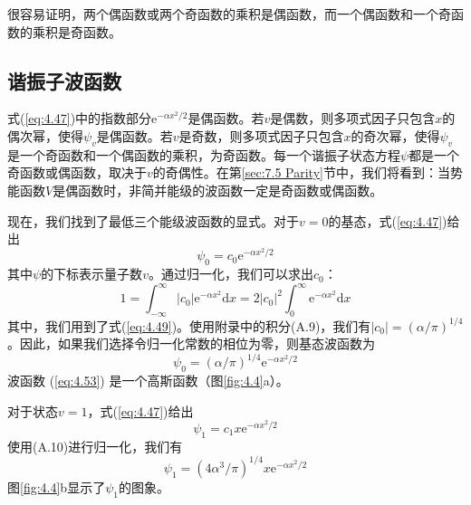     很容易证明，两个偶函数或两个奇函数的乘积是偶函数，而一个偶函数和一个奇函数的乘积是奇函数。
    
\subsection*{谐振子波函数}
    式(\ref{eq:4.47})中的指数部分$\mathrm{e}^{-\alpha x^2/2}$是偶函数。若$v$是偶数，则多项式因子只包含$x$的偶次幂，使得$\psi_v$是偶函数。若$v$是奇数，则多项式因子只包含$x$的奇次幂，使得$\psi_v$是一个奇函数和一个偶函数的乘积，为奇函数。每一个谐振子状态方程$\psi$都是一个奇函数或偶函数，取决于$v$的奇偶性。在第\ref{sec:7.5 Parity}节中，我们将看到：当势能函数$V$是偶函数时，非简并能级的波函数一定是奇函数或偶函数。

    现在，我们找到了最低三个能级波函数的显式。对于$v=0$的基态，式(\ref{eq:4.47})给出
    \begin{equation}
        \psi_0 = c_0\mathrm{e}^{-\alpha x^2/2}
        \label{eq:4.52}
    \end{equation}
    其中$\psi$的下标表示量子数$v$。通过归一化，我们可以求出$c_0$：
    \begin{equation*}
        1 = \int_{-\infty}^{\infty}\left|c_0\right|\mathrm{e}^{-\alpha x^2}\mathrm{d}x = 2\left|c_0\right|^2\int_{0}^{\infty}\mathrm{e}^{-\alpha x^2}\mathrm{d}x
    \end{equation*}
    其中，我们用到了式(\ref{eq:4.49})。使用附录中的积分(A.9)，我们有$\left|c_0\right| = \left(\alpha/\pi\right)^{1/4}$。因此，如果我们选择令归一化常数的相位为零，则基态波函数为
    \begin{equation}
        \psi_0 = \left(\alpha / \pi\right)^{1/4}\mathrm{e}^{-\alpha x^2 /2}
        \label{eq:4.53}
    \end{equation}
    波函数 (\ref{eq:4.53}) 是一个高斯函数（图\ref{fig:4.4}a）。

    对于状态$v=1$，式(\ref{eq:4.47})给出
    \begin{equation}
        \psi_1 = c_1x\mathrm{e}^{-\alpha x^2 / 2}
        \label{eq:4.54}
    \end{equation}
    使用(A.10)进行归一化，我们有
    \begin{equation}
        \psi_1 = \left(4\alpha^3 / \pi\right)^{1/4}x\mathrm{e}^{-\alpha x^2 / 2}
        \label{eq:4.55}
    \end{equation}
    图\ref{fig:4.4}b显示了$\psi_1$的图象。

